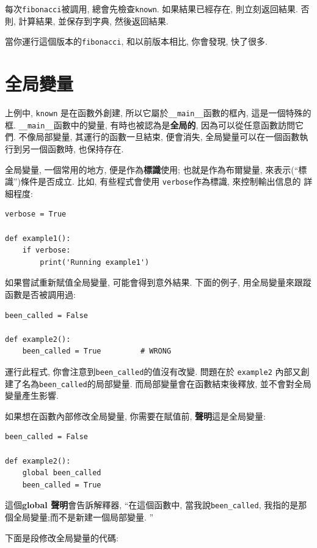 \documentclass[10pt]{book}
\begin{document}
每次{\tt fibonacci}被調用, 總會先檢查{\tt known}. 
如果結果已經存在, 則立刻返回結果. 否則, 計算結果, 
並保存到字典, 然後返回結果. 

當你運行這個版本的{\tt fibonacci}, 和以前版本相比, 
你會發現, 快了很多. 


\section{全局變量}
上例中, {\tt known} 是在函數外創建, 
所以它屬於\verb"__main__"函數的框內, 這是一個特殊的框. 
\verb"__main__"函數中的變量, 有時也被認為是{\bf 全局的}, 
因為可以從任意函數訪問它們. 
不像局部變量, 其運行的函數一旦結束, 便會消失, 
全局變量可以在一個函數執行到另一個函數時, 也保持存在. 

全局變量, 一個常用的地方, 便是作為{\bf 標識}使用;
也就是作為布爾變量, 來表示(``標識'')條件是否成立. 
比如, 有些程式會使用 {\tt verbose}作為標識, 來控制輸出信息的
詳細程度:

\begin{verbatim}
verbose = True

def example1():
    if verbose:
        print('Running example1')
\end{verbatim}
%
如果嘗試重新賦值全局變量, 可能會得到意外結果. 
下面的例子, 用全局變量來跟蹤函數是否被調用過:

\begin{verbatim}
been_called = False

def example2():
    been_called = True         # WRONG
\end{verbatim}
%
運行此程式, 你會注意到\verb"been_called"的值沒有改變. 
問題在於 {\tt example2} 內部又創建了名為\verb"been_called"的局部變量. 
而局部變量會在函數結束後釋放, 並不會對全局變量產生影響. 

如果想在函數內部修改全局變量, 你需要在賦值前, {\bf 聲明}這是全局變量:

\begin{verbatim}
been_called = False

def example2():
    global been_called 
    been_called = True
\end{verbatim}
%
這個{\bf global 聲明}會告訴解釋器,  ``在這個函數中, 當我說\verb"been_called", 
我指的是那個全局變量;而不是新建一個局部變量. ''

下面是段修改全局變量的代碼:
\end{document}
